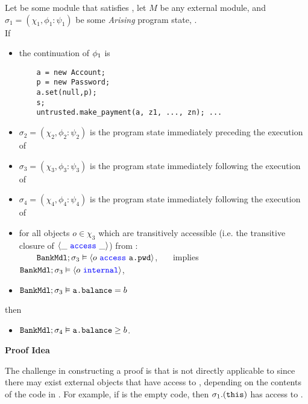\begin{theorem}
\label{thm:safety}
Let  be some module that satisfies \SrobustB, let 
$M$ be any external module, and $\sigma_1 = (\chi_1, \phi_1 : \psi_1)$ be some \textit{Arising} program state,
.
\\
If
\begin{itemize}
\item
the continuation of ${\phi_1}$ is
\begin{verbatim}
    a = new Account; 
    p = new Password; 
    a.set(null,p); 
    s; 
    untrusted.make_payment(a, z1, ..., zn); ...
\end{verbatim}
\item
$\sigma_2 = (\chi_2, \phi_2 : \psi_2)$ is the program state immediately preceding the execution of 
\item
$\sigma_3 = (\chi_3, \phi_3 : \psi_3)$ is the program state immediately following the execution of 
\item
$\sigma_4 = (\chi_4, \phi_4 : \psi_4)$ is the program state immediately following the execution of\\  
\item
for all objects $o \in \chi_3$ which are transitively accessible (i.e. the transitive closure of $\langle \_\ {\color{blue}\texttt{access}}\ \_ \rangle$) from 
:\\
 $\strut \ \ \ \  \ \ {\texttt{BankMdl}}; \sigma_3 \vDash \langle o\ {\color{blue}\texttt{access}}\ {{\texttt{a.pwd}}} \rangle$, \ \ \
implies \ \ \  ${\texttt{BankMdl}}; \sigma_3 \vDash \langle o\ {\color{blue}\texttt{internal}}\rangle$, 
\item
${\texttt{BankMdl}}; \sigma_3 \vDash {\texttt{a.balance}} = b$
\end{itemize}
then 
\begin{itemize}
\item
${\texttt{BankMdl}};\sigma_4 \vDash {\texttt{a.balance}} \geq b$.
\end{itemize}
\end{theorem}

\vspace{.1in}

\noindent
{\bf{Proof Idea}}

\noindent
The challenge in constructing a proof is that \SrobustB is not directly applicable to  since there may exist  external 
objects that have access to \prg{a.password}, depending on the contents of the code in \prg{s}. For example, if \prg{s} 
is the empty code, then $\sigma_1.({\texttt{this}})$ has access to \prg{a}. 

